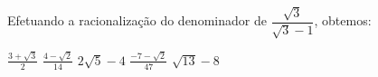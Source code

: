 Efetuando a racionalização do denominador de $\dfrac{\sqrt{3}}{\sqrt{3}-1}$, obtemos:

$\frac{3+\sqrt{3}}{2}$
$\frac{4-\sqrt{2}}{14}$
$2\sqrt{5}-4$
$\frac{-7-\sqrt{2}}{47}$
$\sqrt{13}-8$

